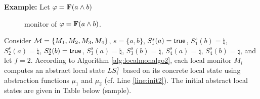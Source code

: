 \textbf{Example:} Let $\varphi = \mathbf{F} (a \wedge b)$ 

\begin{figure}[H]
\centering
{}    
\caption{\LTLtri monitor of $\varphi = \mathbf{F}(a \wedge b)$.}
\end{figure}

Consider $\mathcal{M}=\{M_1, M_2, M_3, M_4\}$, $s=\{a,b\}$, $S^s_1(a)=\mathsf{true}$, 
$S^s_1(b)=\natural$, $S^s_2(a)=\natural$, $S^s_2(b)=\mathsf{true}$, $S^s_3(a) 
=\natural$, $S^s_3(b) =\natural$,  $S^s_4(a) =\natural$, $S^s_4(b) =\natural$, 
and let $f=2$. According to Algorithm \ref{alg:localmonalgo2}, each local 
monitor $M_i$ computes an abstract local state $LS_i^1$ based on its 
concrete local state using abstraction functions $\mu_1$ and $\mu_2$ (cf. Line 
\ref{line:init2}). The initial abstract local states are given in Table below (sample).\\


